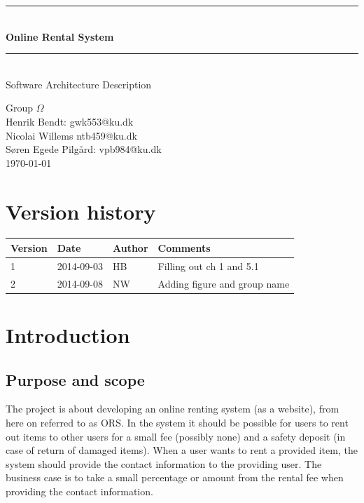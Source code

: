\documentclass[a4paper,11pt]{report}
\makeatletter
\newcommand{\systemname}{Online Rental System}
\newcommand{\groupname}{Group $\Omega$}
\newcommand{\contactdetails}{Henrik Bendt: gwk553@ku.dk\\Nicolai Willems ntb459@ku.dk\\Søren Egede Pilgård: vpb984@ku.dk}
\makeatother
\begin{document}
%
%
\newcommand{\HRule}{\rule{\linewidth}{0.5mm}}
\begin{titlepage}

  \begin{center}

    \vspace*{4cm}
    \HRule \\[0.4cm]
    { \huge \bfseries \systemname}\\[0.4cm]
    \HRule \\[1.5cm]

    {\Large Software Architecture Description}

    \vfill
  \end{center}

  \begin{flushleft}
    {\LARGE \groupname}\\[0.2cm]
    {\large \contactdetails}\\[0.2cm]
   {\large \today}
  \end{flushleft}
\end{titlepage}

%
%
\newpage
\chapter*{Version history}

\begin{center}
  \begin{tabular}[h!]{| l | l | l | p{8 cm} |}
    \hline
    \rowcolor{gray}
    Version & Date & Author & Comments \\
    \hline
    \hline
    1 & 2014-09-03 & HB & Filling out ch 1 and 5.1\\
    \hline
    2 & 2014-09-08 & NW & Adding figure and group name \\
    \hline
  \end{tabular}
\end{center}

%
%
\setcounter{tocdepth}{1}
\tableofcontents

%
%
\chapter{Introduction}
\label{cha:introduction}
\thispagestyle{fancy}


\section{Purpose and scope}
\label{sec:purpose-scope}
The project is about developing an online renting system (as a website), from
here on referred to as ORS. In the system it should be possible for users to
rent out items to other users for a small fee (possibly none) and a safety
deposit (in case of return of damaged items). When a user wants to rent a
provided item, the system should provide the contact information to the
providing user. The business case is to take a small percentage or amount from
the rental fee when providing the contact information.
\end{document}

